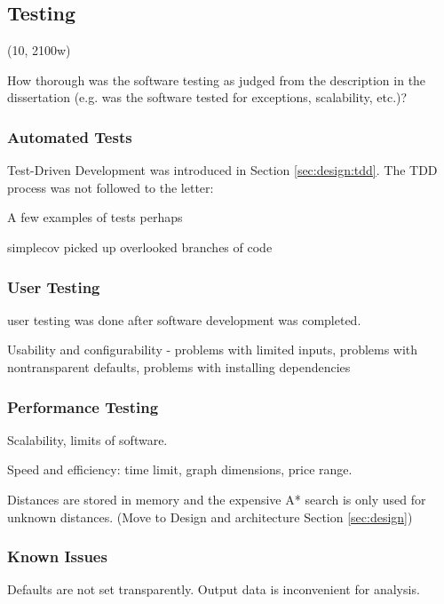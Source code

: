 \subsection{Testing}
\label{sec:implementation:testing}

(10, 2100w)

How thorough was the software testing as judged from the description in the
dissertation (e.g. was the software tested for exceptions, scalability, etc.)?


\subsubsection{Automated Tests}

Test-Driven Development was introduced in Section \ref{sec:design:tdd}. The TDD
process was not followed to the letter: 

A few examples of tests perhaps

simplecov picked up overlooked branches of code


\subsubsection{User Testing}

user testing was done after software development
was completed. 

Usability and configurability - problems with limited inputs, problems with
nontransparent defaults, problems with installing dependencies


\subsubsection{Performance Testing}

Scalability, limits of software. 

Speed and efficiency: time limit, graph dimensions, price range. 

Distances are stored in memory and the expensive A* search is only used for
unknown distances. (Move to Design and architecture Section \ref{sec:design})


\subsubsection{Known Issues}

Defaults are not set transparently. Output data is inconvenient for analysis. 
